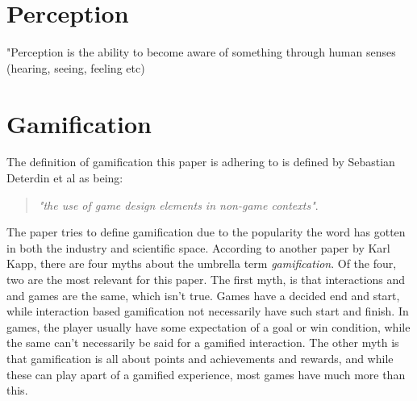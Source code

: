 \section{Perception}
"Perception is the ability to become aware of something through human senses (hearing, seeing, feeling etc)\\







\section{Gamification}
    The definition of gamification this paper is adhering to is defined by Sebastian Deterdin et al as being: \begin{quote}
        \textit{"the use of game design elements in non-game contexts"}\cite{gamification}.
    \end{quote}
    The paper tries to define gamification due to the popularity the word has gotten in both the industry and scientific space\cite{gamification}. According to another paper by Karl Kapp\cite{gamificationMyths}, there are four myths about the umbrella term \textit{gamification}\cite{gamificationMyths}. Of the four, two are the most relevant for this paper. The first myth, is that interactions and and games are the same, which isn't true\cite{gamificationMyths}. Games have a decided end and start, while interaction based gamification not necessarily have such start and finish\cite{gamificationMyths}. In games, the player usually have some expectation of a goal or win condition, while the same can't necessarily be said for a gamified interaction\cite{gamificationMyths}. The other myth is that gamification is all about points and achievements and rewards, and while these can play apart of a gamified experience, most games have much more than this\cite{gamificationMyths}.